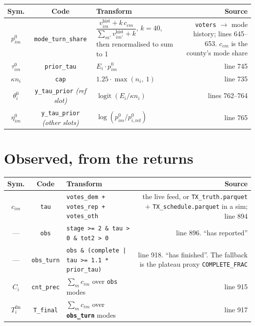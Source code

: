 \documentclass[11pt]{article}
\newcommand{\var}[1]{\texttt{\footnotesize #1}}
\newcommand{\file}[1]{\texttt{\footnotesize #1}}
\newcommand{\logit}{\operatorname{logit}}
\newcommand{\refm}{\mathrm{ref}}
\begin{document}
\begin{center}\footnotesize
\begin{tabular}{@{}SCTR@{}}
\toprule
\textbf{Sym.} & \textbf{Code} & \textbf{Transform} & \textbf{Source} \\
\midrule
$p^{0}_{im}$ & \var{mode\_turn\_share} &
  $\dfrac{v^{\text{hist}}_{im} + k\,c_{cm}}{\sum_{m'} v^{\text{hist}}_{im'} + k}$,
  $k = 40$, then renormalised to sum to 1 &
  \var{voters} $\rightarrow$ mode history; lines 645--653.
  $c_{cm}$ is the county's mode share \\[10pt]
$\tau^{0}_{im}$ & \var{prior\_tau} & $E_i \cdot p^{0}_{im}$ & line 745 \\[4pt]
$\kappa n_i$ & \var{cap} & $1.25 \cdot \max(n_i,\ 1)$ & line 735 \\[4pt]
$\theta^{0}_i$ & \var{y\_tau\_prior} \emph{(ref slot)} &
  $\logit\!\left(E_i / \kappa n_i\right)$ & lines 762--764 \\[4pt]
$\eta^{0}_{im}$ & \var{y\_tau\_prior} \emph{(other slots)} &
  $\log\!\left(p^{0}_{im} \big/ p^{0}_{i,\refm}\right)$ & line 765 \\
\bottomrule
\end{tabular}
\end{center}

\section{Observed, from the returns}

\begin{center}\footnotesize
\begin{tabular}{@{}SCTR@{}}
\toprule
\textbf{Sym.} & \textbf{Code} & \textbf{Transform} & \textbf{Source} \\
\midrule
$c_{im}$ & \var{tau} & \var{votes\_dem + votes\_rep + votes\_oth} &
  the live feed, or \file{TX\_truth.parquet} $+$ \file{TX\_schedule.parquet} in a sim;
  line 894 \\[4pt]
--- & \var{obs} & \var{stage >= 2 \& tau > 0 \& tot2 > 0} &
  line 896. ``has reported'' \\[4pt]
--- & \var{obs\_turn} &
  \var{obs \& (complete | tau >= 1.1 * prior\_tau)} &
  line 918. ``has finished''. The fallback is the plateau proxy
  \var{COMPLETE\_FRAC} \\[4pt]
$C_i$ & \var{cnt\_prec} & $\sum_m c_{im}$ over \var{obs} modes & line 915 \\[4pt]
$T^{\text{fin}}_i$ & \var{T\_final} & $\sum_m c_{im}$ over \textbf{\var{obs\_turn}} modes &
  line 917 \\
\bottomrule
\end{tabular}
\end{center}
\end{document}

